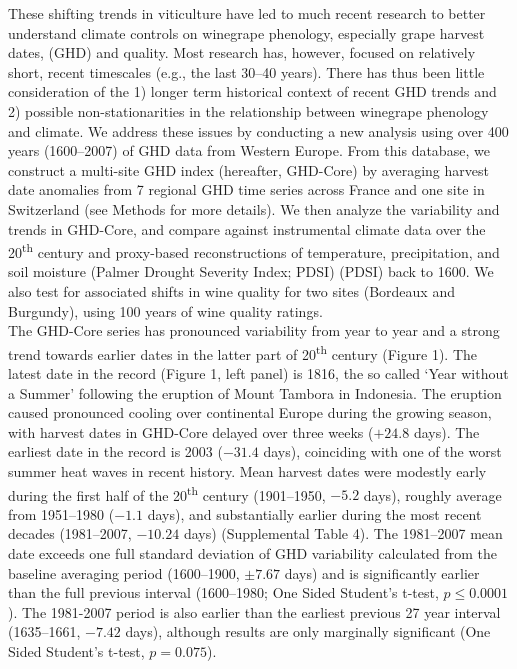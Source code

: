 \documentclass[final]{nature}
\begin{document}
\indent These shifting trends in viticulture have led to much recent research to better understand climate controls on winegrape phenology\cite{odo2012,webb2012}, especially grape harvest dates, (GHD) and quality\cite{coombe1987,jones2005,vanlee2009}.  Most research has, however, focused on relatively short, recent timescales (e.g., the last 30--40 years\cite{Duchene:2005bd,tomasi2011,webb2012}). There has thus been little consideration of the 1) longer term historical context of recent GHD trends and 2) possible non-stationarities in the relationship between winegrape phenology and climate. We address these issues by conducting a new analysis using over 400 years (1600--2007) of GHD data from Western Europe\cite{Daux2012}. From this database, we construct a multi-site GHD index (hereafter, GHD-Core) by averaging harvest date anomalies from 7 regional GHD time series across France and one site in Switzerland (see Methods for more details). We then analyze the variability and trends in GHD-Core, and compare against instrumental climate data over the 20\textsuperscript{th} century\cite{Harris2014} and proxy-based reconstructions of temperature\cite{Luterbacher2004}, precipitation\cite{Pauling2006}, and soil moisture (Palmer Drought Severity Index; PDSI)\cite{CookOWDA2015} (PDSI) back to 1600. We also test for associated shifts in wine quality for two sites (Bordeaux and Burgundy), using 100 years of wine quality ratings\cite{Broadbent2002}.\\
\indent The GHD-Core series has pronounced variability from year to year and a strong trend towards earlier dates in the latter part of 20\textsuperscript{th} century (Figure 1). The latest date in the record (Figure 1, left panel) is 1816, the so called `Year without a Summer' following the eruption of Mount Tambora in Indonesia\cite{Oppenheimer2003}. The eruption caused pronounced cooling over continental Europe during the growing season, with harvest dates in GHD-Core delayed over three weeks ($+24.8$ days). The earliest date in the record is 2003 ($-31.4$ days), coinciding with one of the worst summer heat waves in recent history\cite{Rebetz2006}. Mean harvest dates were modestly early during the first half of the 20\textsuperscript{th} century (1901--1950, $-5.2$ days), roughly average from 1951--1980 ($-1.1$ days), and substantially earlier during the most recent decades (1981--2007, $-10.24$ days) (Supplemental Table 4). The 1981--2007 mean date exceeds one full standard deviation of GHD variability calculated from the baseline averaging period (1600--1900, $\pm7.67$ days) and is significantly earlier than the full previous interval (1600--1980; One Sided Student's t-test, $p\le0.0001$). The 1981-2007 period is also earlier than the earliest previous 27 year interval (1635--1661, $-7.42$ days), although results are only marginally significant (One Sided Student's t-test, $p=0.075$).\\
\end{document}
